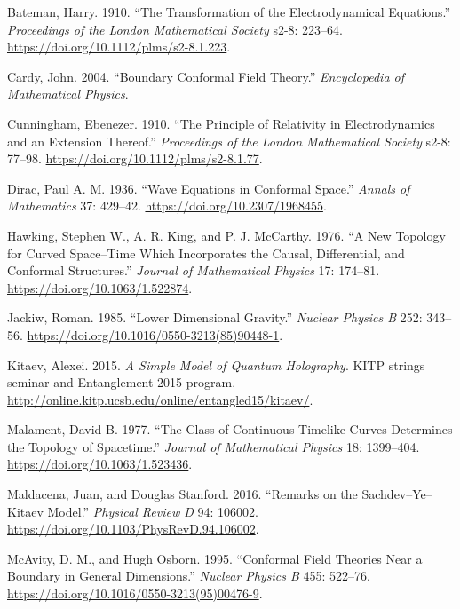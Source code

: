 \protect{}\label{refs}
\begin{CSLReferences}{1}{1}
Bateman, Harry. 1910. {``The Transformation of the Electrodynamical
Equations.''} \emph{Proceedings of the London Mathematical Society}
s2-8: 223--64. \url{https://doi.org/10.1112/plms/s2-8.1.223}.

Cardy, John. 2004. {``Boundary Conformal Field Theory.''}
\emph{Encyclopedia of Mathematical Physics}.

Cunningham, Ebenezer. 1910. {``The Principle of Relativity in
Electrodynamics and an Extension Thereof.''} \emph{Proceedings of the
London Mathematical Society} s2-8: 77--98.
\url{https://doi.org/10.1112/plms/s2-8.1.77}.

Dirac, Paul A. M. 1936. {``Wave Equations in Conformal Space.''}
\emph{Annals of Mathematics} 37: 429--42.
\url{https://doi.org/10.2307/1968455}.

Hawking, Stephen W., A. R. King, and P. J. McCarthy. 1976. {``A New
Topology for Curved Space--Time Which Incorporates the Causal,
Differential, and Conformal Structures.''} \emph{Journal of Mathematical
Physics} 17: 174--81. \url{https://doi.org/10.1063/1.522874}.

Jackiw, Roman. 1985. {``Lower Dimensional Gravity.''} \emph{Nuclear
Physics B} 252: 343--56.
\url{https://doi.org/10.1016/0550-3213(85)90448-1}.

Kitaev, Alexei. 2015. \emph{A Simple Model of Quantum Holography}. KITP
strings seminar and Entanglement 2015 program.
\url{http://online.kitp.ucsb.edu/online/entangled15/kitaev/}.

Malament, David B. 1977. {``The Class of Continuous Timelike Curves
Determines the Topology of Spacetime.''} \emph{Journal of Mathematical
Physics} 18: 1399--404. \url{https://doi.org/10.1063/1.523436}.

Maldacena, Juan, and Douglas Stanford. 2016. {``Remarks on the
{Sachdev--Ye--Kitaev} Model.''} \emph{Physical Review D} 94: 106002.
\url{https://doi.org/10.1103/PhysRevD.94.106002}.

McAvity, D. M., and Hugh Osborn. 1995. {``Conformal Field Theories Near
a Boundary in General Dimensions.''} \emph{Nuclear Physics B} 455:
522--76. \url{https://doi.org/10.1016/0550-3213(95)00476-9}.


\end{CSLReferences}

